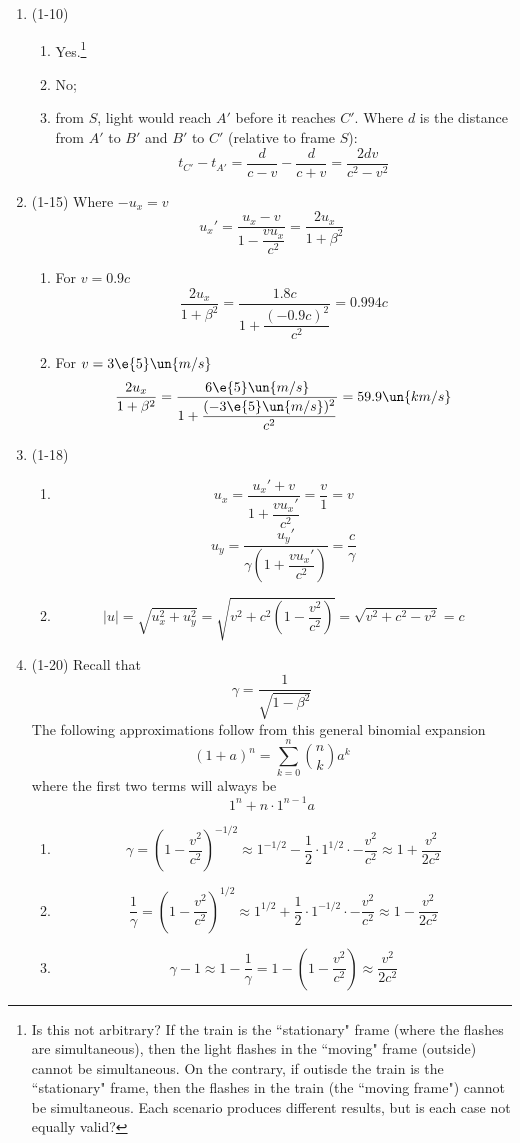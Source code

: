 \documentclass{physicsHW}
\begin{document}
\begin{enumerate}
\item (1-10)
	\begin{enumerate}
		\item Yes.\footnote{Is this not arbitrary? If the train is the ``stationary" frame (where the flashes are simultaneous), then the light flashes in the ``moving" frame (outside) cannot be simultaneous. On the contrary, if outisde the train is the ``stationary" frame, then the flashes in the train (the ``moving frame") cannot be simultaneous. Each scenario produces different results, but is each case not equally valid?}
		\item No;
		\item from $S$, light would reach $A'$ before it reaches $C'$. Where $d$ is the distance from $A'$ to $B'$ and $B'$ to $C'$ (relative to frame $S$):
			\[t_{C'} - t_{A'} = \frac{d}{c-v} - \frac{d}{c+v} = \frac{2dv}{c^2-v^2}\]
	\end{enumerate}

\item (1-15) Where $- u_x = v$
	\[u_x' = \frac{u_x-v} {1-\dfrac{vu_x} {c^2}} = \frac{2u_x}{1+\beta^2}\]
	\begin{enumerate}
		\item For $v = 0.9c$
			\[\frac{2u_x}{1+\beta^2} = \frac{1.8c}{1+\dfrac{(-0.9c)^2}{c^2}} = 0.994c \]
		\item For $v = 3\e{5}\un{m/s}$
			\[\frac{2u_x}{1+\beta^2} = \frac{6\e{5}\un{m/s}}{1+\dfrac{(-3\e{5}\un{m/s})^2}{c^2}} = 59.9 \un{km/s} \]
		
	\end{enumerate}

\item (1-18)
	\begin{enumerate}
		\item \[u_x = \frac{u_x'+v} {1+ \dfrac{vu_x'} {c^2}} = \frac{v} {1} = v\]
			\[u_y = \frac{u_y'} {\gamma \left( 1+ \dfrac{vu_x'} {c^2} \right)} =  \frac{c} {\gamma} \]
		\item \[|u| = \sqrt{u_x^2+u_y^2} =  \sqrt{ v^2+ c^2 \left(1 - \frac{v^2}{c^2} \right)} = \sqrt{ v^2 + c^2 - v^2} = c \] 
	\end{enumerate}

\item (1-20) Recall that
	\[\gamma = \frac{1} {\sqrt{1-\beta^2}}\]
	The following approximations follow from this general binomial expansion
	\[(1+a)^n = \sum_{k=0}^n {n \choose k} a^k\]
	where the first two terms will always be
	\[1^n + n\cdot 1^{n-1}a\]
	\begin{enumerate}
		\item \[\gamma = \left( 1 - \frac{v^2}{c^2} \right)^{-1/2} \approx 1^{-1/2} - \frac{1}{2}\cdot 1^{1/2} \cdot - \frac{v^2}{c^2} \approx 1 + \frac{v^2}{2c^2}\]
		\item \[\frac{1}{\gamma} = \left( 1 - \frac{v^2}{c^2} \right)^{1/2} \approx 1^{1/2} + \frac{1}{2}\cdot 1^{-1/2} \cdot -  \frac{v^2}{c^2} \approx 1 - \frac{v^2}{2c^2}\]
		\item \[\gamma - 1 \approx 1 - \frac{1}{\gamma} = 1 - \left(1 - \frac{v^2}{c^2} \right) \approx \frac{v^2}{2c^2} \]
	\end{enumerate}


\end{enumerate}
\end{document}
